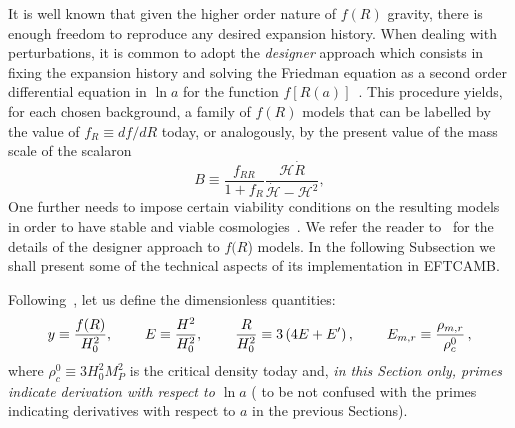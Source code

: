 \documentclass[prd,nofootinbib,showpacs]{revtex4}
\def\be{\begin{equation}}
\def\ee{\end{equation}}
\def\f{\frac}
\def\hub{{\mathcal H}}
\begin{document}
{It is well known that  given the higher order nature of $f(R)$ gravity, there is enough freedom to reproduce any desired expansion history. When dealing with perturbations, it is common to adopt the \emph{designer} approach which consists in fixing the expansion history and solving the Friedman equation as a second order differential equation in $\ln a$ for the function $f[R(a)]$~\cite{Song:2006ej,Pogosian:2007sw}. This procedure yields, for each chosen background, a family of $f(R)$ models that can be labelled by the value of $f_R\equiv df/dR$ today, or analogously, by the present value of the mass scale of the scalaron
\be\label{B}
B\equiv\f{f_{RR}}{1+f_R}\f{\hub\dot{R}}{\dot{\hub}-\hub^2},
\ee
One further needs to impose certain viability conditions on the resulting models in order to have stable and viable cosmologies~\cite{Pogosian:2007sw}.
We refer the reader to~\cite{Song:2006ej,Pogosian:2007sw} for the details of the designer approach to $f(R$) models. In the following Subsection we shall present some of the technical aspects of its implementation in EFTCAMB.

Following~\cite{Pogosian:2007sw}, let us define the dimensionless quantities:
\begin{align}
y\equiv \frac{f(R)}{H_0^2}, \hspace{0.8cm} E \equiv \frac{H^2}{H_0^2}, \hspace{0.8cm} \frac{R}{H_0^2} \equiv 3\left(4 E +E' \right),\hspace{0.8cm}E_{m,r}\equiv\f{\rho_{m,r}}{\rho_c^0}\,,
\end{align}
where $\rho_c^0\equiv 3H_0^2M_P^2$ is the critical density today and, \emph{in this Section only, primes indicate derivation with respect to $\ln a$} ( to  be not confused with the primes indicating derivatives with respect to $a$ in the previous Sections).
 
}
\end{document}
